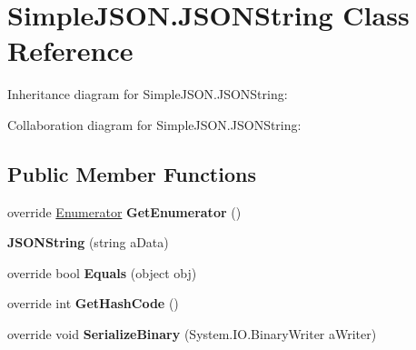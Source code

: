 \hypertarget{classSimpleJSON_1_1JSONString}{}\section{Simple\+J\+S\+O\+N.\+J\+S\+O\+N\+String Class Reference}
\label{classSimpleJSON_1_1JSONString}


Inheritance diagram for Simple\+J\+S\+O\+N.\+J\+S\+O\+N\+String\+:


Collaboration diagram for Simple\+J\+S\+O\+N.\+J\+S\+O\+N\+String\+:
\subsection*{Public Member Functions}
\begin{DoxyCompactItemize}
\item 
override \hyperlink{structSimpleJSON_1_1JSONNode_1_1Enumerator}{Enumerator} {\bfseries Get\+Enumerator} ()\hypertarget{classSimpleJSON_1_1JSONString_a560bdd4a0ed0a1cb49595e4727544000}{}\label{classSimpleJSON_1_1JSONString_a560bdd4a0ed0a1cb49595e4727544000}

\item 
{\bfseries J\+S\+O\+N\+String} (string a\+Data)\hypertarget{classSimpleJSON_1_1JSONString_a04c6b1eac02af092eb905d13faa0ae56}{}\label{classSimpleJSON_1_1JSONString_a04c6b1eac02af092eb905d13faa0ae56}

\item 
override bool {\bfseries Equals} (object obj)\hypertarget{classSimpleJSON_1_1JSONString_a9447ae4a7d0d64fdb9f8f6c8656344b2}{}\label{classSimpleJSON_1_1JSONString_a9447ae4a7d0d64fdb9f8f6c8656344b2}

\item 
override int {\bfseries Get\+Hash\+Code} ()\hypertarget{classSimpleJSON_1_1JSONString_ad0ab35d499706132576e6a19f88c0572}{}\label{classSimpleJSON_1_1JSONString_ad0ab35d499706132576e6a19f88c0572}

\item 
override void {\bfseries Serialize\+Binary} (System.\+I\+O.\+Binary\+Writer a\+Writer)\hypertarget{classSimpleJSON_1_1JSONString_aeaca9dd6bf9172278b7ca566ffeea083}{}\label{classSimpleJSON_1_1JSONString_aeaca9dd6bf9172278b7ca566ffeea083}

\end{DoxyCompactItemize}
